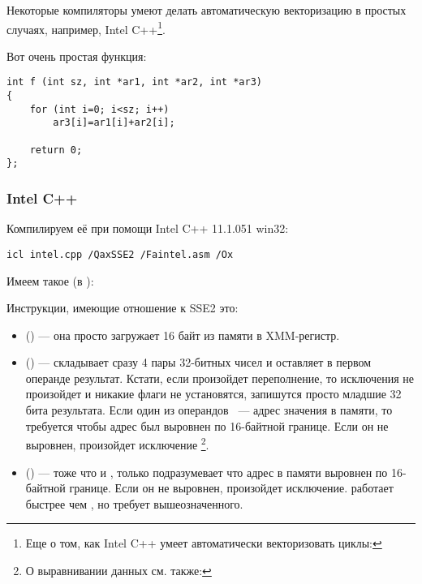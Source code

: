 Некоторые компиляторы умеют делать автоматическую векторизацию в простых случаях, 
например, Intel C++\footnote{Еще о том, как Intel C++ умеет автоматически векторизовать циклы: \URLINTELVEC}.

Вот очень простая функция:

\begin{lstlisting}
int f (int sz, int *ar1, int *ar2, int *ar3)
{
	for (int i=0; i<sz; i++)
		ar3[i]=ar1[i]+ar2[i];

	return 0;
};
\end{lstlisting}

\subsubsection{Intel C++}

Компилируем её при помощи Intel C++ 11.1.051 win32:

\begin{verbatim}
icl intel.cpp /QaxSSE2 /Faintel.asm /Ox
\end{verbatim}

Имеем такое (в \IDA):



Инструкции, имеющие отношение к SSE2 это:
\begin{itemize}
\item
\MOVDQU () --- она просто загружает 16 байт из памяти в XMM-регистр.

\item
\PADDD () --- складывает сразу 4 пары 32-битных чисел и оставляет в первом операнде результат. 
Кстати, если произойдет переполнение, то исключения не произойдет и никакие флаги не установятся, 
запишутся просто младшие 32 бита результата. 
Если один из операндов \PADDD ~--- адрес значения в памяти, 
то требуется чтобы адрес был выровнен по 16-байтной границе. Если он не выровнен, произойдет исключение
\footnote{О выравнивании данных см. также: \URLWPDA}.

\item
\MOVDQA () --- тоже что и \MOVDQU, только подразумевает 
что адрес в памяти выровнен по 16-байтной границе. 
Если он не выровнен, произойдет исключение. 
\MOVDQA работает быстрее чем \MOVDQU, но требует вышеозначенного.

\end{itemize}

